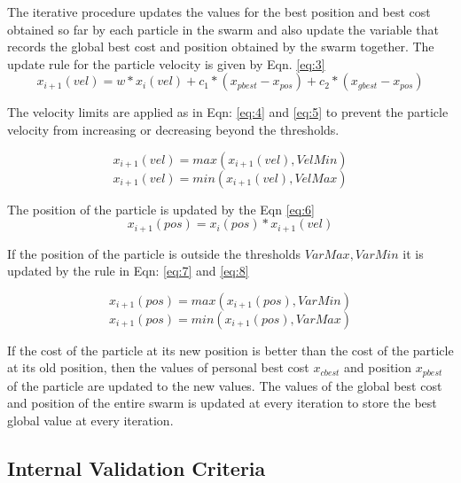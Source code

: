 \documentclass{svproc}
\begin{document}
The iterative procedure updates the values for the best position and best cost obtained so far by each particle in the swarm and also update the variable that records the global best cost and position obtained by the swarm together. The update rule for the particle velocity is given by Eqn. \ref{eq:3}\\

  \begin{equation}\label{eq:3}
   x_{i+1}(vel) = w * x_{i}(vel) + c_1 * (x_{pbest} - x_{pos}) + c_2 * (x_{gbest} - x_{pos})
  \end{equation}
  
The velocity limits are applied as in Eqn: \ref{eq:4} and \ref{eq:5} to prevent the particle velocity from increasing or decreasing beyond the thresholds.
  
  \begin{equation}\label{eq:4}
  x_{i+1}(vel) = max(x_{i+1}(vel), VelMin)
  \end{equation}
   \begin{equation}\label{eq:5}
  x_{i+1}(vel) = min(x_{i+1}(vel), VelMax)  
  \end{equation}
  
 The position of the particle is updated by the Eqn \ref{eq:6}
   \begin{equation}\label{eq:6}
  x_{i+1}(pos) = x_{i}(pos) * x_{i+1}(vel)
  \end{equation}
  
  If the position of the particle is outside the thresholds $VarMax, VarMin$ it is updated by the rule in Eqn: \ref{eq:7} and \ref{eq:8}
  
    \begin{equation}\label{eq:7}
  x_{i+1}(pos) = max(x_{i+1}(pos), VarMin)
  \end{equation}
   \begin{equation}\label{eq:8}
  x_{i+1}(pos) = min(x_{i+1}(pos), VarMax)  
  \end{equation}
  
If the cost of the particle at its new position is better than the cost of the particle at its old position, then the values of personal best cost $x_{cbest}$ and position $x_{pbest}$ of the particle are updated to the new values. The values of the global best cost and position of the entire swarm is updated at every iteration to store the best global value at every iteration.

\subsection{Internal Validation Criteria}
\end{document}
